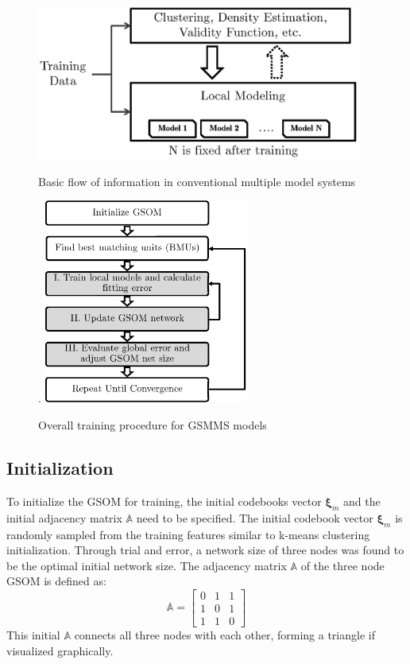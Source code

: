 \documentclass[review,3p]{elsarticle}
\renewcommand\[{\begin{equation}}
\renewcommand\]{\end{equation}}
\begin{document}
\begin{figure}
  \centering
  \includegraphics[width=0.95\textwidth]{figures/gsmms/other_methods_flowchart.eps}\\
  \caption{Basic flow of information in conventional multiple model systems}\label{fig:other_methods_flowchart}
\end{figure}
\begin{figure}.
  \centering
  \includegraphics[width=0.6\textwidth]{figures/gsmms/gsmms_training.eps}\\
  \caption{Overall training procedure for GSMMS models}\label{fig:gsmms_training}
\end{figure}


\subsection{Initialization}
To initialize the GSOM for training, the initial codebooks vector ${\mathbf \xi_m}$ and the initial adjacency matrix $\mathbb A$ need to be specified. The initial codebook vector ${\mathbf \xi_m}$
is randomly sampled from the training features similar to k-means clustering initialization. Through trial and error, a network size of three nodes was found to be the optimal initial network size. The adjacency matrix $\mathbb A$ of the three node GSOM is defined as:
\[\mathbb{A} = \left[ {\begin{array}{*{20}{c}}
0&1&1\\
1&0&1\\
1&1&0
\end{array}} \right]\]
This initial $\mathbb A$ connects all three nodes with each other,
forming a triangle if visualized graphically.
\end{document}
